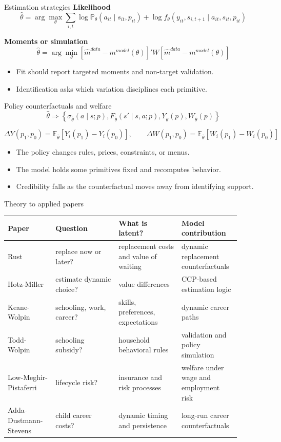 \documentclass[aspectratio=169,11pt]{beamer}
\newcommand{\E}{\mathbb{E}}
\newcommand{\1}{\mathbf{1}}
\newcommand{\Prb}{\mathbb{P}}
\begin{document}
\begin{frame}{Estimation strategies}
\small
\textbf{Likelihood}
\[
\widehat\theta
=
\arg\max_{\theta}
\sum_{i,t}
\log \Prb_{\theta}(a_{it}\mid s_{it},p_{it})
+
\log f_{\theta}(y_{it},s_{i,t+1}\mid a_{it},s_{it},p_{it})
\]

\textbf{Moments or simulation}
\[
\widehat\theta
=
\arg\min_{\theta}
\left[\widehat m^{data}-m^{model}(\theta)\right]'
W
\left[\widehat m^{data}-m^{model}(\theta)\right]
\]

\begin{itemize}
    \item Fit should report targeted moments and non-target validation.
    \item Identification asks which variation disciplines each primitive.
\end{itemize}
\end{frame}

\begin{frame}{Policy counterfactuals and welfare}
\[
\widehat\theta
\Longrightarrow
\left\{
\sigma_{\widehat\theta}(a\mid s;p),
F_{\widehat\theta}(s'\mid s,a;p),
Y_{\widehat\theta}(p),
W_{\widehat\theta}(p)
\right\}
\]

\[
\Delta Y(p_1,p_0)
=
\E_{\widehat\theta}[Y_i(p_1)-Y_i(p_0)],
\qquad
\Delta W(p_1,p_0)
=
\E_{\widehat\theta}[W_i(p_1)-W_i(p_0)]
\]

\begin{itemize}
    \item The policy changes rules, prices, constraints, or menus.
    \item The model holds some primitives fixed and recomputes behavior.
    \item Credibility falls as the counterfactual moves away from identifying support.
\end{itemize}
\end{frame}

\begin{frame}{Theory to applied papers}
\small
\begin{tabular}{p{0.19\linewidth} p{0.25\linewidth} p{0.25\linewidth} p{0.21\linewidth}}
\toprule
Paper & Question & What is latent? & Model contribution \\
\midrule
Rust & replace now or later? & replacement costs and value of waiting & dynamic replacement counterfactuals \\
Hotz-Miller & estimate dynamic choice? & value differences & CCP-based estimation logic \\
Keane-Wolpin & schooling, work, career? & skills, preferences, expectations & dynamic career paths \\
Todd-Wolpin & schooling subsidy? & household behavioral rules & validation and policy simulation \\
Low-Meghir-Pistaferri & lifecycle risk? & insurance and risk processes & welfare under wage and employment risk \\
Adda-Dustmann-Stevens & child career costs? & dynamic timing and persistence & long-run career counterfactuals \\
\bottomrule
\end{tabular}
\end{frame}
\end{document}
